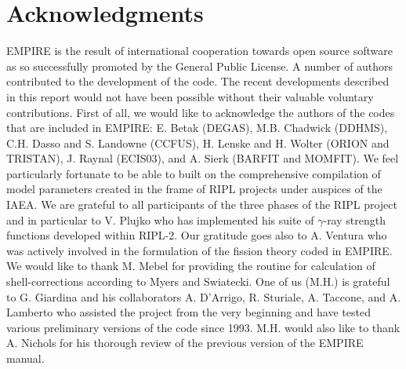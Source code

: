 \documentclass[twocolumn,amsmath,amssymb,10pt,groupedaddress,a4paper]{revtex4}
\begin{document}
\section*{Acknowledgments}
EMPIRE is the result of international cooperation towards open source software as so successfully promoted by the General Public License. A number of authors contributed to the development of the code. The recent developments described in this report would not have been possible without their valuable voluntary contributions. First of all, we would like to acknowledge the authors of the codes that are included in EMPIRE: E. Betak (DEGAS), M.B. Chadwick (DDHMS), C.H. Dasso and S. Landowne (CCFUS), H. Lenske and H. Wolter (ORION and TRISTAN), J. Raynal (ECIS03), and A. Sierk (BARFIT and MOMFIT). We feel particularly fortunate to be able to built on the comprehensive compilation of model parameters created in the frame of RIPL projects under auspices of the IAEA. We are grateful to all participants of the three phases of the RIPL project and in particular to V. Plujko who has implemented his suite of $\gamma$-ray strength functions developed within RIPL-2. Our gratitude goes also to A. Ventura who was actively involved in the formulation of the fission theory coded in EMPIRE. We would like to thank M. Mebel for providing the routine for calculation of shell-corrections according to Myers and Swiatecki. One of us (M.H.) is grateful to G. Giardina and his collaborators A. D'Arrigo, R. Sturiale, A. Taccone, and A. Lamberto who assisted the project from the very beginning and have tested various preliminary versions of the code since 1993. M.H. would also like to thank A. Nichols for his thorough review of the previous version of the EMPIRE manual.

\end{document}

